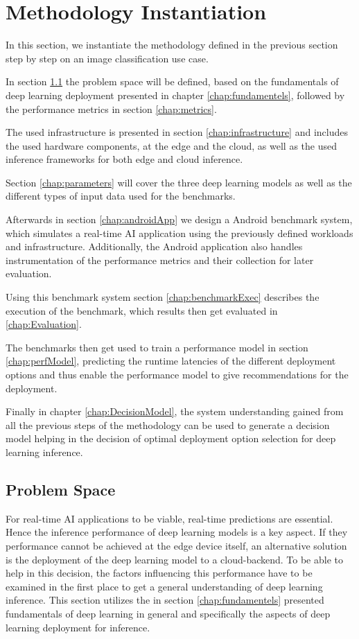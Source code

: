 \chapter{Methodology Instantiation}
\label{chap:experiments}
In this section, we instantiate the methodology defined in the previous section step by step on an image classification use case.

In section \ref{chap:problemSpace} the problem space will be defined, based on the fundamentals of deep learning deployment presented in chapter \ref{chap:fundamentels}, followed by the performance metrics in section \ref{chap:metrics}.


The used infrastructure is presented in section \ref{chap:infrastructure} and includes the used hardware components, at the edge and the cloud, as well as the used inference frameworks for both edge and cloud inference.

Section \ref{chap:parameters} will cover the three deep learning models as well as the different types of input data used for the benchmarks.

Afterwards in section \ref{chap:androidApp} we design a Android benchmark system, which simulates a real-time AI application using the previously defined workloads and infrastructure. Additionally, the Android application also handles instrumentation of the performance metrics and their collection for later evaluation.

Using this benchmark system section \ref{chap:benchmarkExec} describes the execution of the benchmark, which results then get evaluated in \ref{chap:Evaluation}.

The benchmarks then get used to train a performance model in section \ref{chap:perfModel}, predicting the runtime latencies of the different deployment options and thus enable the performance model to give recommendations for the deployment.

Finally in chapter \ref{chap:DecisionModel}, the system understanding gained from all the previous steps of the methodology can be used to generate a decision model helping in the decision of optimal deployment option selection for deep learning inference.


\section{Problem Space}
\label{chap:problemSpace}
For real-time AI applications to be viable, real-time predictions are essential. Hence the inference performance of deep learning models is a key aspect.
If they performance cannot be achieved at the edge device itself, an alternative solution is the deployment of the deep learning model to a cloud-backend.
To be able to help in this decision, the factors influencing this performance have to be examined in the first place to get a general understanding of deep learning inference.
This section utilizes the in section \ref{chap:fundamentels} presented fundamentals of deep learning in general and specifically the aspects of deep learning deployment for inference.

